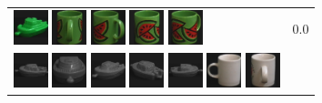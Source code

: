 \begin{figure}[!p]
\begin{center}
\begin{tabular}{m{11cm} | m{3cm} |}
\includegraphics[width=1cm]{coil/beeld-57.eps}
\includegraphics[width=1cm]{coil/beeld-35.eps}
\includegraphics[width=1cm]{coil/beeld-34.eps}
\includegraphics[width=1cm]{coil/beeld-32.eps}
\includegraphics[width=1cm]{coil/beeld-33.eps}
& {\scriptsize 0.0}
\\
\includegraphics[width=1cm]{coil/beeld-24.eps}
\includegraphics[width=1cm]{coil/beeld-28.eps}
\includegraphics[width=1cm]{coil/beeld-29.eps}
\includegraphics[width=1cm]{coil/beeld-25.eps}
\includegraphics[width=1cm]{coil/beeld-27.eps}
\includegraphics[width=1cm]{coil/beeld-37.eps}
\includegraphics[width=1cm]{coil/beeld-41.eps}

\end{tabular}
\end{center}
\end{figure}
